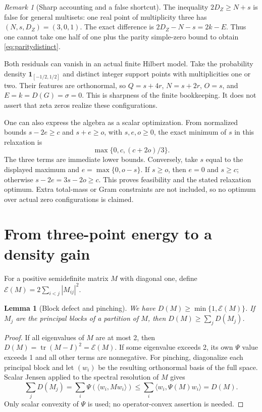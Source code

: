 \documentclass[11pt]{article}
\newtheorem{lemma}[theorem]{Lemma}
\theoremstyle{remark}
\newtheorem{remark}[theorem]{Remark}
\DeclareMathOperator{\tr}{tr}
\newcommand{\cE}{\mathcal E}
\begin{document}
\begin{remark}[Sharp accounting and a false shortcut]
The inequality $2D_Z\ge N+s$ is false for general multisets: one real
point of multiplicity three has $(N,s,D_Z)=(3,0,1)$. The exact difference
is $2D_Z-N-s=2k-E$. Thus one cannot take one half of one plus the parity
simple-zero bound to obtain \eqref{eq:paritydistinct}.

Both residuals can vanish in an actual finite Hilbert model. Take the
probability density $\mathbf1_{[-1/2,1/2]}$ and distinct integer support
points with multiplicities one or two. Their features are orthonormal,
so $Q=s+4r$, $N=s+2r$, $O=s$, and $E=k=D(G)=\sigma=0$.
This is sharpness of the finite bookkeeping. It does not assert that zeta
zeros realize these configurations.
\end{remark}

One can also express the algebra as a scalar optimization. From normalized
bounds $s-2e\ge c$ and $s+e\ge o$, with $s,e,o\ge0$, the exact minimum
of $s$ in this relaxation is
\begin{equation}\label{eq:relaxedLP}
 \max\{0,c,(c+2o)/3\}.
\end{equation}
The three terms are immediate lower bounds. Conversely, take $s$ equal
to the displayed maximum and $e=\max\{0,o-s\}$. If $s\ge o$, then
$e=0$ and $s\ge c$; otherwise $s-2e=3s-2o\ge c$. This proves
feasibility and the stated relaxation optimum. Extra total-mass or Gram
constraints are not included, so no optimum over actual zero configurations
is claimed.

\section{From three-point energy to a density gain}

For a positive semidefinite matrix $M$ with diagonal one, define
$\cE(M)=2\sum_{i<j}|M_{ij}|^2$.

\begin{lemma}[Block defect and pinching]\label{lem:pinch}
We have $D(M)\ge\min\{1,\cE(M)\}$. If $M_j$ are the principal blocks
of a partition of $M$, then $D(M)\ge\sum_jD(M_j)$.
\end{lemma}
\begin{proof}
If all eigenvalues of $M$ are at most 2, then
$D(M)=\tr(M-I)^2=\cE(M)$. If some eigenvalue exceeds 2, its own
$\Psi$ value exceeds 1 and all other terms are nonnegative.
For pinching, diagonalize each principal block and let $(w_i)$ be the
resulting orthonormal basis of the full space. Scalar Jensen applied to
the spectral resolution of $M$ gives
\[
 \sum_jD(M_j)=\sum_i\Psi(\langle w_i,Mw_i\rangle)
 \le\sum_i\langle w_i,\Psi(M)w_i\rangle=D(M).
\]
Only scalar convexity of $\Psi$ is used; no operator-convex assertion is
needed.
\end{proof}
\end{document}
